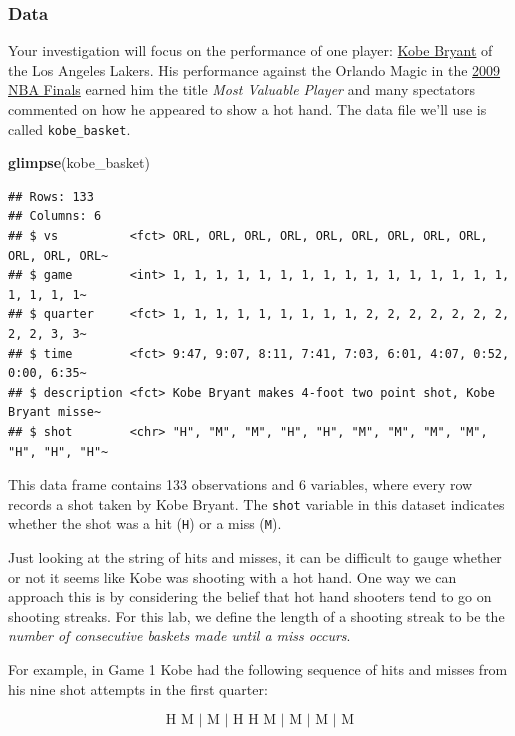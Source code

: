 \documentclass[
]{article}
\newenvironment{Shaded}{\begin{snugshade}}{\end{snugshade}}
\newcommand{\FunctionTok}[1]{\textcolor[rgb]{0.13,0.29,0.53}{\textbf{#1}}}
\newcommand{\NormalTok}[1]{#1}
\begin{document}
\subsubsection{Data}\label{data}

Your investigation will focus on the performance of one player:
\href{https://en.wikipedia.org/wiki/Kobe_Bryant}{Kobe Bryant} of the Los
Angeles Lakers. His performance against the Orlando Magic in the
\href{https://en.wikipedia.org/wiki/2009_NBA_Finals}{2009 NBA Finals}
earned him the title \emph{Most Valuable Player} and many spectators
commented on how he appeared to show a hot hand. The data file we'll use
is called \texttt{kobe\_basket}.

\begin{Shaded}
\begin{Highlighting}[]
\FunctionTok{glimpse}\NormalTok{(kobe\_basket)}
\end{Highlighting}
\end{Shaded}

\begin{verbatim}
## Rows: 133
## Columns: 6
## $ vs          <fct> ORL, ORL, ORL, ORL, ORL, ORL, ORL, ORL, ORL, ORL, ORL, ORL~
## $ game        <int> 1, 1, 1, 1, 1, 1, 1, 1, 1, 1, 1, 1, 1, 1, 1, 1, 1, 1, 1, 1~
## $ quarter     <fct> 1, 1, 1, 1, 1, 1, 1, 1, 1, 2, 2, 2, 2, 2, 2, 2, 2, 2, 3, 3~
## $ time        <fct> 9:47, 9:07, 8:11, 7:41, 7:03, 6:01, 4:07, 0:52, 0:00, 6:35~
## $ description <fct> Kobe Bryant makes 4-foot two point shot, Kobe Bryant misse~
## $ shot        <chr> "H", "M", "M", "H", "H", "M", "M", "M", "M", "H", "H", "H"~
\end{verbatim}

This data frame contains 133 observations and 6 variables, where every
row records a shot taken by Kobe Bryant. The \texttt{shot} variable in
this dataset indicates whether the shot was a hit (\texttt{H}) or a miss
(\texttt{M}).

Just looking at the string of hits and misses, it can be difficult to
gauge whether or not it seems like Kobe was shooting with a hot hand.
One way we can approach this is by considering the belief that hot hand
shooters tend to go on shooting streaks. For this lab, we define the
length of a shooting streak to be the \emph{number of consecutive
baskets made until a miss occurs}.

For example, in Game 1 Kobe had the following sequence of hits and
misses from his nine shot attempts in the first quarter:

\[ \textrm{H M | M | H H M | M | M | M} \]
\end{document}
